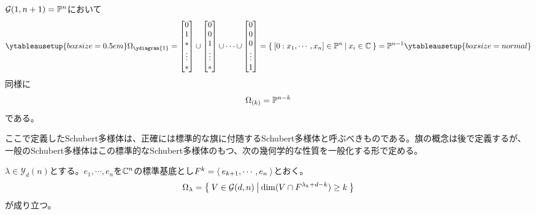 \documentclass{ltjsreport}
\begin{document}
\begin{eg}
  $\mathcal{G}(1,n+1)=\mathbb{P}^n$において
  \[
  \ytableausetup{boxsize=0.5em}
  \Omega_{\ydiagram{1}}=\bmat{0\\1\\ * \\ \vdots \\ *}\cup \bmat{0\\0\\1\\\vdots\\ * }\cup\cdots\cup\bmat{0\\0\\0\\\vdots\\1}=\set{[0:x_1,\cdots,x_n]\in\proj^n}{x_i\in\complex}=\proj^{n-1}
  \ytableausetup{boxsize=normal}
  \]
  同様に
  \[
  \Omega_{(k)}=\mathbb{P}^{n-k}  
  \]
  である。
\end{eg}


ここで定義したSchubert多様体は、正確には標準的な旗に付随するSchubert多様体と呼ぶべきものである。旗の概念は後で定義するが、一般のSchubert多様体はこの標準的なSchubert多様体のもつ、次の幾何学的な性質を一般化する形で定める。

\begin{prop}\label{schubert_var}
  $\lambda\in\mathcal{Y}_d(n)$とする。$e_1,\cdots,e_n$を$\mathbb{C}^n$の標準基底とし$F^k=\langle\:e_{k+1},\cdots,e_n\:\rangle$とおく。
  \[
  \Omega_{\lambda}=\left\{\:V\in\mathcal{G}(d,n)\:\middle|\:\dim(V\cap F^{\lambda_k+d-k})\geq k\:\right\}  
  \]
  が成り立つ。
\end{prop}
\end{document}

